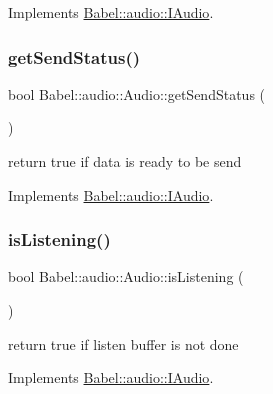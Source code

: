 Implements \hyperlink{classBabel_1_1audio_1_1IAudio_a9a1da6f7226da4a5bd14a5bbd12b66dc}{Babel\+::audio\+::\+I\+Audio}.

\mbox{\label{classBabel_1_1audio_1_1Audio_afb3a0176f9f575c6f13a85ca1b92f375}} 
\subsubsection{\texorpdfstring{get\+Send\+Status()}{getSendStatus()}}
{\footnotesize\ttfamily bool Babel\+::audio\+::\+Audio\+::get\+Send\+Status (\begin{DoxyParamCaption}{ }\end{DoxyParamCaption})\hspace{0.3cm}{\ttfamily [virtual]}}

return true if data is ready to be send 

Implements \hyperlink{classBabel_1_1audio_1_1IAudio_a82e0b4db1206688c792221ce253ca5cc}{Babel\+::audio\+::\+I\+Audio}.

\mbox{\label{classBabel_1_1audio_1_1Audio_a7491f94ee8a8bac6603727e29919cd12}} 
\subsubsection{\texorpdfstring{is\+Listening()}{isListening()}}
{\footnotesize\ttfamily bool Babel\+::audio\+::\+Audio\+::is\+Listening (\begin{DoxyParamCaption}{ }\end{DoxyParamCaption})\hspace{0.3cm}{\ttfamily [virtual]}}

return true if listen buffer is not done 

Implements \hyperlink{classBabel_1_1audio_1_1IAudio_af11d02c62648df4fdf25dd6dbc64904b}{Babel\+::audio\+::\+I\+Audio}.

\mbox{\label{classBabel_1_1audio_1_1Audio_ae05b545cad9e1db811dc3a27bb7fd7d8}} 
